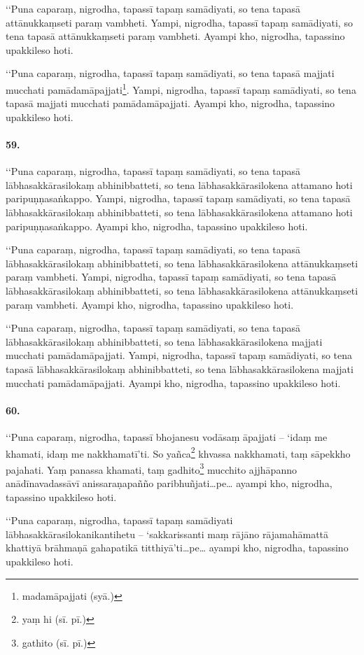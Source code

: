 ‘‘Puna caparaṃ, nigrodha, tapassī tapaṃ samādiyati, so tena tapasā attānukkaṃseti paraṃ vambheti. Yampi, nigrodha, tapassī tapaṃ samādiyati, so tena tapasā attānukkaṃseti paraṃ vambheti. Ayampi kho, nigrodha, tapassino upakkileso hoti.

‘‘Puna caparaṃ, nigrodha, tapassī tapaṃ samādiyati, so tena tapasā majjati mucchati pamādamāpajjati\footnote{madamāpajjati (syā.)}. Yampi, nigrodha, tapassī tapaṃ samādiyati, so tena tapasā majjati mucchati pamādamāpajjati. Ayampi kho, nigrodha, tapassino upakkileso hoti.

\paragraph{59.} ‘‘Puna caparaṃ, nigrodha, tapassī tapaṃ samādiyati, so tena tapasā lābhasakkārasilokaṃ abhinibbatteti, so tena lābhasakkārasilokena attamano hoti paripuṇṇasaṅkappo. Yampi, nigrodha, tapassī tapaṃ samādiyati, so tena tapasā lābhasakkārasilokaṃ abhinibbatteti, so tena lābhasakkārasilokena attamano hoti paripuṇṇasaṅkappo. Ayampi kho, nigrodha, tapassino upakkileso hoti.

‘‘Puna caparaṃ, nigrodha, tapassī tapaṃ samādiyati, so tena tapasā lābhasakkārasilokaṃ abhinibbatteti, so tena lābhasakkārasilokena attānukkaṃseti paraṃ vambheti. Yampi, nigrodha, tapassī tapaṃ samādiyati, so tena tapasā lābhasakkārasilokaṃ abhinibbatteti, so tena lābhasakkārasilokena attānukkaṃseti paraṃ vambheti. Ayampi kho, nigrodha, tapassino upakkileso hoti.

‘‘Puna caparaṃ, nigrodha, tapassī tapaṃ samādiyati, so tena tapasā lābhasakkārasilokaṃ abhinibbatteti, so tena lābhasakkārasilokena majjati mucchati pamādamāpajjati. Yampi, nigrodha, tapassī tapaṃ samādiyati, so tena tapasā lābhasakkārasilokaṃ abhinibbatteti, so tena lābhasakkārasilokena majjati mucchati pamādamāpajjati. Ayampi kho, nigrodha, tapassino upakkileso hoti.

\paragraph{60.} ‘‘Puna caparaṃ, nigrodha, tapassī bhojanesu vodāsaṃ āpajjati – ‘idaṃ me khamati, idaṃ me nakkhamatī’ti. So yañca\footnote{yaṃ hi (sī. pī.)} khvassa nakkhamati, taṃ sāpekkho pajahati. Yaṃ panassa khamati, taṃ gadhito\footnote{gathito (sī. pī.)} mucchito ajjhāpanno anādīnavadassāvī anissaraṇapañño paribhuñjati…pe… ayampi kho, nigrodha, tapassino upakkileso hoti.

‘‘Puna caparaṃ, nigrodha, tapassī tapaṃ samādiyati lābhasakkārasilokanikantihetu – ‘sakkarissanti maṃ rājāno rājamahāmattā khattiyā brāhmaṇā gahapatikā titthiyā’ti…pe… ayampi kho, nigrodha, tapassino upakkileso hoti.

